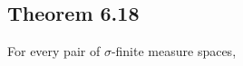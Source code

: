 \documentclass[../main.tex]{subfiles}
\begin{document}
\subsection{Theorem 6.18}
\begin{wts}
For every pair of $\sigma$-finite measure spaces, 
\end{wts}
\end{document}
